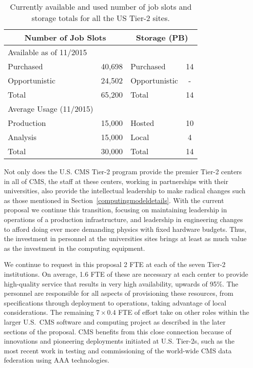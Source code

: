 \documentclass[11pt,a4paper]{article}
\begin{document}
\begin{table}
\begin{center}
\begin{tabular}{|l|c|l|c|}
\hline
\multicolumn{2}{|c|}{Number of Job Slots} &  \multicolumn{2}{|c|}{Storage (PB)} \\ \hline
Available as of 11/2015 &          &               &    \\
Purchased     & 40,698             & Purchased     & 14 \\
Opportunistic & 24,502             & Opportunistic & -  \\
Total         & 65,200             & Total         & 14 \\ \hline
Average Usage (11/2015) &          &               &    \\
Production    & 15,000             & Hosted        & 10 \\
Analysis      & 15,000             & Local         &  4 \\
Total         & 30,000             & Total         & 14 \\ \hline
\end{tabular}
\caption[]
{
Currently available and used number of job slots and storage totals
for all the US Tier-2 sites.
}
\label{current-resources}
\end{center}
\end{table}

Not only does the U.S. CMS Tier-2 program provide the premier Tier-2
centers in all of CMS, the staff at these centers, working in partnerships
with their universities, also provide the intellectual leadership to make
radical changes such as those mentioned in
Section~\ref{computingmodeldetails}.  With the current proposal we continue
this transition, focusing on maintaining leadership in operations of a
production infrastructure, and leadership in engineering changes to afford
doing ever more demanding physics with fixed hardware budgets.  Thus, the
investment in personnel at the universities sites brings at least as much
value as the investment in the computing equipment.

We continue to request in this proposal 2 FTE at each of the seven Tier-2
institutions.  On average, 1.6 FTE of these are necessary at each center to
provide high-quality service that results in very high availability,
upwards of 95\%. The personnel are responsible for all aspects of
provisioning these resources, from specifications through deployment to
operations, taking advantage of local considerations.  The remaining
$7 \times 0.4$ FTE of effort take on other roles within the larger U.S.~CMS
software and computing project as described in the later sections of
the proposal.  CMS benefits from this close connection because of
innovations and pioneering deployments initiated at U.S. Tier-2s, such as the
most recent work in testing and commissioning of the world-wide CMS data
federation using AAA technologies.
\end{document}
